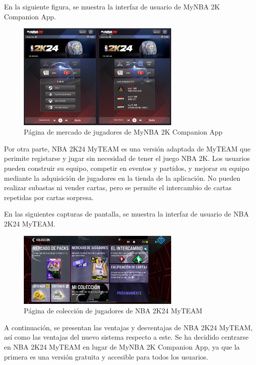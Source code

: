 En la siguiente figura, se muestra la interfaz de usuario de MyNBA 2K Companion App.
\begin{figure}[H]
    \centering
    \includegraphics[width=0.7\textwidth]{figures/4-Estudio-viabilidad/4_NBA.png}
    \caption{Página de mercado de jugadores de MyNBA 2K Companion App}
    \label{fig:nba_2k}
    \hypertarget{fig:nba_2k}{}
\end{figure}

Por otra parte, NBA 2K24 MyTEAM es una versión adaptada de MyTEAM que perimite registarse y jugar sin necesidad de tener el juego NBA 2K. 
Los usuarios pueden construir su equipo, competir en eventos y partidos, y mejorar su equipo mediante la adquisición de jugadores en la tienda de la aplicación. 
No pueden realizar subastas ni vender cartas, pero se permite el intercambio de cartas repetidas por cartas sorpresa.

En las siguientes capturas de pantalla, se muestra la interfaz de usuario de NBA 2K24 MyTEAM.
\begin{figure}[H]
    \centering
    \includegraphics[width=0.7\textwidth]{figures/4-Estudio-viabilidad/4_NBA2.jpeg}
    \caption{Página de colección de jugadores de NBA 2K24 MyTEAM}
    \label{fig:nba_2k_2}
    \hypertarget{fig:nba_2k_2}{}
\end{figure}

A continuación, se presentan las ventajas y desventajas de NBA 2K24 MyTEAM, así como las ventajas del nuevo sistema respecto a este. 
Se ha decidido centrarse en NBA 2K24 MyTEAM en lugar de MyNBA 2K Companion App, ya que la primera es una versión gratuita y accesible para todos los usuarios.

